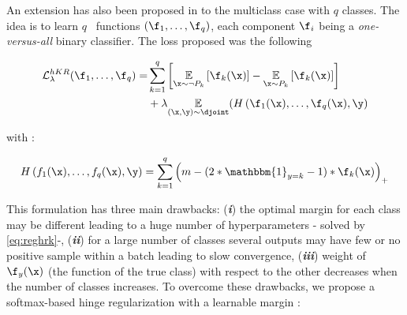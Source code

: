 An extension has also been proposed in \cite{serrurier2021achieving} to the  multiclass case with $q$ classes. The idea is to learn $q$ \onlyonelip~functions $(\f_1, \ldots, \f_q)$, each component $\f_i$ being a  \textit{one-versus-all} binary classifier. The loss proposed was the following 

\begin{align}\label{eq:hkr_multi}
\begin{split}
 \mathcal{L}^{hKR}_\lambda(\f_1,\ldots,\f_q) =&
 \sum_{k=1}^q \left[\underset{\x \sim \neg P_k}{\mathbb{E}} \left[\f_k(\x)\right] -\underset{\x \sim P_k}{\mathbb{E}}\left[\f_k(\x)\right] \right]
\\ 
&+\lambda \underset{(\x,\y) \sim \djoint}{\mathbb{E}}(H\left(\f_1(\x),\ldots, \f_q(\x) ,\y\right)
	\end{split}
\end{align}


with :

\begin{equation}
\label{eq:hinge_multi}
H\left(f_1(\x),\ldots, f_q(\x),\y \right) =\sum_{k=1}^q \left(m -(2*\mathbbm{1}_{y=k}-1)*\f_k(\x)\right)_+
\end{equation}



This formulation has three main drawbacks: (\textbf{\textit{i}}) the optimal margin for each class may be different leading to a huge number of hyperparameters - solved by \cref{eq:reghrk}-, (\textbf{\textit{ii}}) for a large number of classes several outputs may have few or no positive sample within a batch leading to slow convergence, (\textbf{\textit{iii}})  weight of $\f_y(\x)$ (the function of the true class) with respect to the other decreases when the number of classes increases. To overcome these drawbacks, we propose a softmax-based hinge regularization with a learnable margin :

